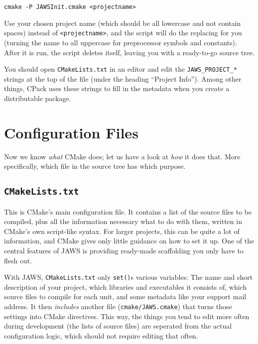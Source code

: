 \begin{lstlisting}
cmake -P JAWSInit.cmake <projectname>
\end{lstlisting}

Use your chosen project name (which should be all lowercase and not contain spaces) instead of \lstinline{<projectname>}, and the script will do the replacing for you (turning the name to all uppercase for preprocessor symbols and constants). After it is run, the script deletes itself, leaving you with a ready-to-go source tree.

You should open \lstinline{CMakeLists.txt} in an editor and edit the \lstinline{JAWS_PROJECT_*} strings at the top of the file (under the heading ``Project Info''). Among other things, CPack uses these strings to fill in the metadata when you create a distributable package.

\section{Configuration Files}

Now we know \emph{what} CMake does; let us have a look at \emph{how} it does that. More specifically, which file in the source tree has which purpose.

\subsection{\texttt{CMakeLists.txt}}

This is CMake's main configuration file. It contains a list of the source files to be compiled, plus all the information necessary what to do with them, written in CMake's own script-like syntax. For larger projects, this can be quite a lot of information, and CMake gives only little guidance on how to set it up. One of the central features of JAWS is providing ready-made scaffolding you only have to flesh out.

With JAWS, \lstinline{CMakeLists.txt} only \lstinline{set()}s various variables: The name and short description of your project, which libraries and executables it consists of, which source files to compile for each unit, and some metadata like your support mail address. It then \emph{includes} another file (\lstinline{cmake/JAWS.cmake}) that turns those settings into CMake directives. This way, the things you tend to edit more often during development (the lists of source files) are seperated from the actual configuration logic, which should not require editing that often.

